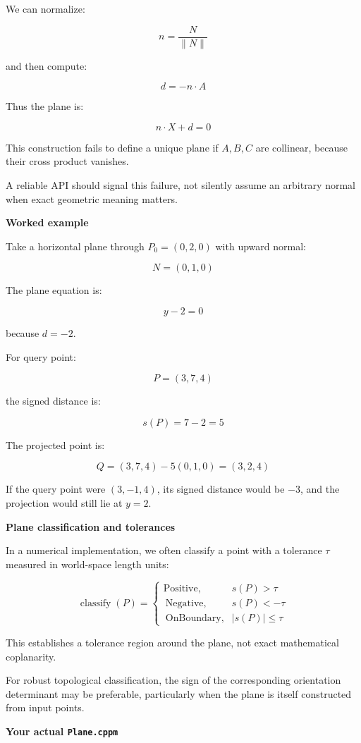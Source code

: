 We can normalize:

\[
n=\frac{N}{\|N\|}
\]

and then compute:

\[
d=-n\cdot A
\]

Thus the plane is:

\[
n\cdot X+d=0
\]

This construction fails to define a unique plane if \(A,B,C\) are collinear, because their cross product vanishes.

A reliable API should signal this failure, not silently assume an arbitrary normal when exact geometric meaning matters.

\textbf{Worked example}

Take a horizontal plane through \(P_0=(0,2,0)\) with upward normal:

\[
N=(0,1,0)
\]

The plane equation is:

\[
y-2=0
\]

because \(d=-2\).

For query point:

\[
P=(3,7,4)
\]

the signed distance is:

\[
s(P)=7-2=5
\]

The projected point is:

\[
Q=(3,7,4)-5(0,1,0)=(3,2,4)
\]

If the query point were \((3,-1,4)\), its signed distance would be \(-3\), and the projection would still lie at \(y=2\).

\textbf{Plane classification and tolerances}

In a numerical implementation, we often classify a point with a tolerance \(\tau\) measured in world-space length units:

\[
\operatorname{classify}(P)= \begin{cases} \text{Positive}, & s(P)>\tau\\\ \text{Negative}, & s(P)<-\tau\\\ \text{OnBoundary}, & |s(P)|\le\tau \end{cases}
\]

This establishes a tolerance region around the plane, not exact mathematical coplanarity.

For robust topological classification, the sign of the corresponding orientation determinant may be preferable, particularly when the plane is itself constructed from input points.

\textbf{Your actual \texttt{Plane.cppm}}

